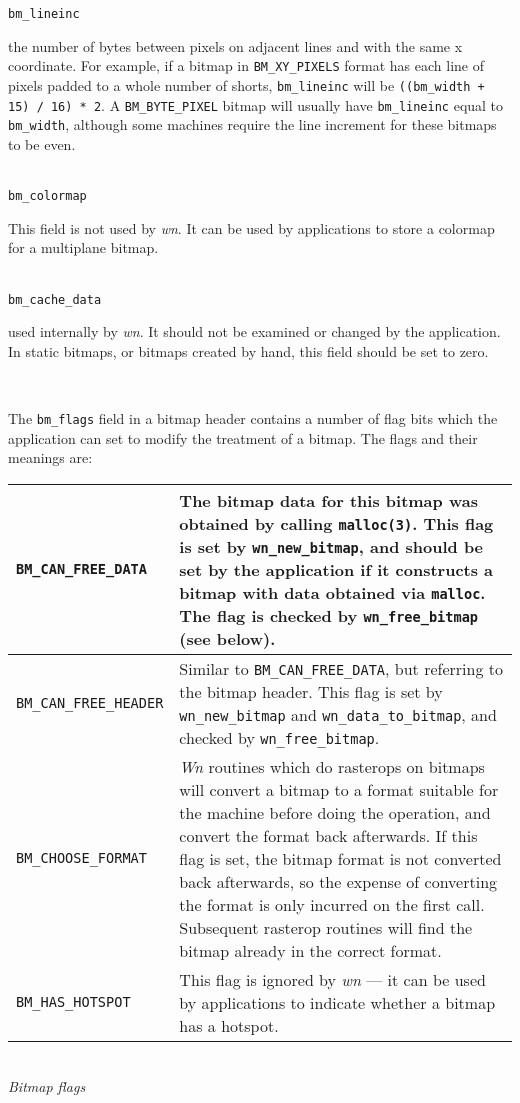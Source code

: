 \begin{tabbing}
{\tt bm\_lineinc} \>
\parbox[t]{4.75in}{the number of bytes between pixels
on adjacent lines and with the same x coordinate.
For example, if a bitmap in {\tt BM\_XY\_PIXELS} format has each line
of pixels padded to a whole number of
shorts, {\tt bm\_lineinc} will be {\tt ((bm\_width + 15) / 16) * 2}.
A {\tt BM\_BYTE\_PIXEL} bitmap will usually have {\tt bm\_lineinc} equal
to {\tt bm\_width}, although some machines require the line increment
for these bitmaps to be even. }\\[0.1in]

{\tt bm\_colormap} \>
\parbox[t]{4.75in}{This field is not used by {\em wn}.
It can be used by applications to store a colormap for a multiplane
bitmap.}\\[0.1in]

{\tt bm\_cache\_data} \>
\parbox[t]{4.75in}{used internally by {\em wn}.
It should not be examined or changed by the application.
In static bitmaps, or bitmaps created by hand,
this field should be set to zero. }\\[0.1in]
\end{tabbing}
The {\tt bm\_flags} field in a bitmap header contains a number of flag
bits which the application can set to modify the treatment of a bitmap.
The flags and their meanings are:
\begin{center}
\begin{tabular}{|l|p{4in}|} \hline

{\tt BM\_CAN\_FREE\_DATA} &
The bitmap data for this bitmap was obtained by calling {\tt malloc(3)}.
This flag is set by {\tt wn\_new\_bitmap}, and should be set by the
application if it constructs a bitmap with data obtained via {\tt malloc}.
The flag is checked by {\tt wn\_free\_bitmap} (see below).\\ \hline

{\tt BM\_CAN\_FREE\_HEADER} &
Similar to {\tt BM\_CAN\_FREE\_DATA}, but referring to the bitmap header.
This flag is set by {\tt wn\_new\_bitmap} and
{\tt wn\_data\_to\_bitmap}, and checked by {\tt wn\_free\_bitmap}.\\ \hline

{\tt BM\_CHOOSE\_FORMAT} &
{\em Wn} routines which do rasterops on bitmaps will convert a bitmap
to a format suitable for the machine before doing the operation,
and convert the format back afterwards.
If this flag is set, the bitmap format is not converted back afterwards,
so the expense of converting the format is only incurred on the first call.
Subsequent rasterop routines will find the bitmap already in the
correct format.\\ \hline

{\tt BM\_HAS\_HOTSPOT} &
This flag is ignored by {\em wn} --- it can be used by applications
to indicate whether a bitmap has a hotspot.\\ \hline
\end{tabular}\\[0.1in]
{\em Bitmap flags}
\end{center}
